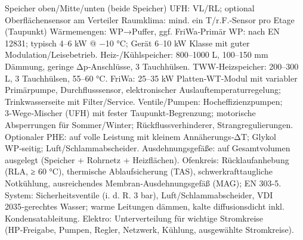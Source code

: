 \markdownRendererUlItem Speicher oben/Mitte/unten (beide Speicher)\markdownRendererUlItemEnd 
\markdownRendererUlItem UFH: VL/RL; optional Oberflächensensor am Verteiler\markdownRendererUlItemEnd 
\markdownRendererUlItem Raumklima: mind. ein T/r.F.-Sensor pro Etage (Taupunkt)\markdownRendererUlItemEnd 
\markdownRendererUlItem Wärmemengen: WP→Puffer, ggf. FriWa‑Primär\markdownRendererUlItemEnd 
\markdownRendererUlEndTight \markdownRendererInterblockSeparator
{}
\markdownRendererSectionEnd \markdownRendererSectionBegin
{}\markdownRendererInterblockSeparator
{}\markdownRendererUlBeginTight
\markdownRendererUlItem WP: nach EN 12831; typisch 4–6 kW @ −10 °C; Gerät 6–10 kW Klasse mit guter Modulation/Leisebetrieb.\markdownRendererUlItemEnd 
\markdownRendererUlItem Heiz-/Kühlspeicher: 800–1000 L, 100–150 mm Dämmung, geringe Δp‑Anschlüsse, 3 Tauchhülsen.\markdownRendererUlItemEnd 
\markdownRendererUlItem TWW‑Heizspeicher: 200–300 L, 3 Tauchhülsen, 55–60 °C.\markdownRendererUlItemEnd 
\markdownRendererUlItem FriWa: 25–35 kW Platten‑WT‑Modul mit variabler Primärpumpe, Durchflusssensor, elektronischer Auslauftemperaturregelung; Trinkwasserseite mit Filter/Service.\markdownRendererUlItemEnd 
\markdownRendererUlItem Ventile/Pumpen: Hocheffizienzpumpen; 3‑Wege‑Mischer (UFH) mit fester Taupunkt‑Begrenzung; motorische Absperrungen für Sommer/Winter; Rückflussverhinderer, Strangregulierungen.\markdownRendererUlItemEnd 
\markdownRendererUlItem Optionaler PHE: auf volle Leistung mit kleinem Annäherungs‑ΔT; Glykol WP‑seitig; Luft/Schlammabscheider.\markdownRendererUlItemEnd 
\markdownRendererUlItem Ausdehnungsgefäße: auf Gesamtvolumen ausgelegt (Speicher + Rohrnetz + Heizflächen).\markdownRendererUlItemEnd 
\markdownRendererUlEndTight \markdownRendererInterblockSeparator
{}
\markdownRendererSectionEnd \markdownRendererSectionBegin
{}\markdownRendererInterblockSeparator
{}\markdownRendererUlBeginTight
\markdownRendererUlItem Ofenkreis: Rücklaufanhebung (RLA, ≥ 60 °C), thermische Ablaufsicherung (TAS), schwerkrafttaugliche Notkühlung, ausreichendes Membran‑Ausdehnungsgefäß (MAG); EN 303‑5.\markdownRendererUlItemEnd 
\markdownRendererUlItem System: Sicherheitsventile (i. d. R. 3 bar), Luft/Schlammabscheider, VDI 2035‑gerechtes Wasser; warme Leitungen dämmen, kalte diffusionsdicht inkl. Kondensatableitung.\markdownRendererUlItemEnd 
\markdownRendererUlItem Elektro: Unterverteilung für wichtige Stromkreise (HP‑Freigabe, Pumpen, Regler, Netzwerk, Kühlung, ausgewählte Stromkreise).\markdownRendererUlItemEnd 

